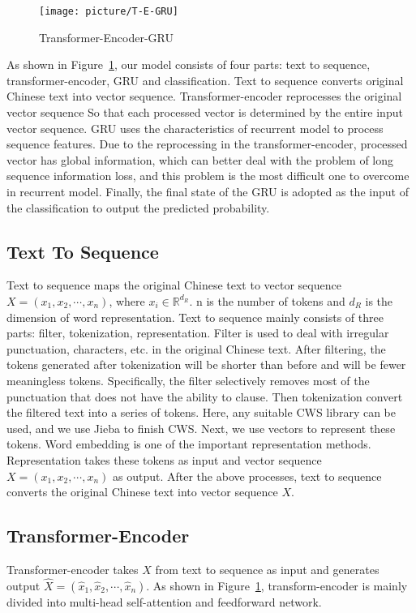 \begin{figure}
	\centering
	\texttt{[image: picture/T-E-GRU]}
	\caption{Transformer-Encoder-GRU}
	\label{fig:Transformer-Encoder-GRU}       %
\end{figure}

As shown in Figure~\ref{fig:Transformer-Encoder-GRU}, our model consists of four parts: text to sequence, transformer-encoder, GRU and classification. Text to sequence converts original Chinese text into vector sequence. Transformer-encoder reprocesses the original vector sequence So that each processed vector is determined by the entire input vector sequence. GRU uses the characteristics of recurrent model to process sequence features. Due to the reprocessing in the transformer-encoder, processed vector has global information, which can better deal with the problem of long sequence information loss, and this problem is the most difficult one to overcome in recurrent model. Finally, the final state of the GRU is adopted as the input of the classification to output the predicted probability.

\subsection{Text To Sequence}
Text to sequence maps the original Chinese text to vector sequence $X = (x_1,x_2,\cdots,x_n)$, where $x_i\in \mathbb{R}^{d_{R}} $. n is the number of tokens and $d_R$ is the dimension of word representation. Text to sequence mainly consists of three parts: filter, tokenization, representation.
Filter is used to deal with irregular punctuation, characters, etc. in the original Chinese text. After filtering, the tokens generated after tokenization will be shorter than before and will be fewer meaningless tokens. Specifically, the filter selectively removes most of the punctuation that does not have the ability to clause. Then tokenization convert the filtered text into a series of tokens. Here, any suitable CWS library can be used, and we use Jieba to finish CWS. Next, we use vectors to represent these tokens. Word embedding is one of the important representation methods. Representation takes these tokens as input and vector sequence $X = (x_1,x_2,\cdots,x_n)$ as output. After the above processes, text to sequence converts the original Chinese text into vector sequence $X$.

\subsection{Transformer-Encoder}
Transformer-encoder takes $X$ from text to sequence as input and generates output $\hat{X} = (\hat{x}_1,\hat{x}_2,\cdots ,\hat{x}_n)$. As shown in Figure~\ref{fig:Transformer-Encoder-GRU}, transform-encoder is mainly divided into multi-head self-attention and feedforward network.

